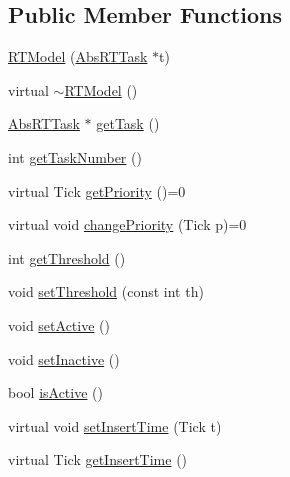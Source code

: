 \subsection*{Public Member Functions}
\begin{DoxyCompactItemize}
\item 
\hyperlink{classRTSim_1_1RTModel_aa17f391f6aa3e6edd62a56cc272fc1d3}{R\+T\+Model} (\hyperlink{classRTSim_1_1AbsRTTask}{Abs\+R\+T\+Task} $\ast$t)
\item 
virtual \hyperlink{classRTSim_1_1RTModel_a5aec12ff0e1524d83e5cb5505a6dbc07}{$\sim$\+R\+T\+Model} ()
\item 
\hyperlink{classRTSim_1_1AbsRTTask}{Abs\+R\+T\+Task} $\ast$ \hyperlink{classRTSim_1_1RTModel_a0eca392648e8de31e52750f3f1aa99c1}{get\+Task} ()
\item 
int \hyperlink{classRTSim_1_1RTModel_a45cddebb6e5e491371f85ce2091ffe74}{get\+Task\+Number} ()
\item 
virtual Tick \hyperlink{classRTSim_1_1RTModel_a407df7778a2ee8c26ecab64f6ab95555}{get\+Priority} ()=0
\item 
virtual void \hyperlink{classRTSim_1_1RTModel_ace689bb96c2597352c183ed449803a80}{change\+Priority} (Tick p)=0
\item 
int \hyperlink{classRTSim_1_1RTModel_a4422fc42c2cce7f1e41f98f360db9a8e}{get\+Threshold} ()
\item 
void \hyperlink{classRTSim_1_1RTModel_a31f4062c525d9f39e5b75fcfc0968d81}{set\+Threshold} (const int th)
\item 
void \hyperlink{classRTSim_1_1RTModel_acdc29e2ae6d8ae49cd9d742d03bfa236}{set\+Active} ()
\item 
void \hyperlink{classRTSim_1_1RTModel_acd69e1702e4e9efc3d610787256df8af}{set\+Inactive} ()
\item 
bool \hyperlink{classRTSim_1_1RTModel_a391f61e5fcfae574b75e17859aec895c}{is\+Active} ()
\item 
virtual void \hyperlink{classRTSim_1_1RTModel_a8d2d279bead0ad6ce11bd1ba8fad72ad}{set\+Insert\+Time} (Tick t)
\item 
virtual Tick \hyperlink{classRTSim_1_1RTModel_ac24a34fc8d0766b7ffe5ddb5c1855599}{get\+Insert\+Time} ()
\end{DoxyCompactItemize}
